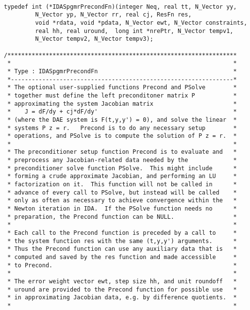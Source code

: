 \documentclass[11pt]{article}
\begin{document}
\small
\begin{verbatim}
                        
typedef int (*IDASpgmrPrecondFn)(integer Neq, real tt, N_Vector yy,
         N_Vector yp, N_Vector rr, real cj, ResFn res, 
         void *rdata, void *pdata, N_Vector ewt, N_Vector constraints, 
         real hh, real uround,  long int *nrePtr, N_Vector tempv1, 
         N_Vector tempv2, N_Vector tempv3);
 
/******************************************************************
 *                                                                *           
 * Type : IDASpgmrPrecondFn                                       *
 *----------------------------------------------------------------*
 * The optional user-supplied functions Precond and PSolve        *
 * together must define the left preconditoner matrix P           *
 * approximating the system Jacobian matrix                       *
 *    J = dF/dy + cj*dF/dy'                                       *
 * (where the DAE system is F(t,y,y') = 0), and solve the linear  *
 * systems P z = r.   Precond is to do any necessary setup        *
 * operations, and PSolve is to compute the solution of P z = r.  *
 *                                                                *
 * The preconditioner setup function Precond is to evaluate and   *
 * preprocess any Jacobian-related data needed by the             *
 * preconditioner solve function PSolve.  This might include      *
 * forming a crude approximate Jacobian, and performing an LU     *
 * factorization on it.  This function will not be called in      *
 * advance of every call to PSolve, but instead will be called    *
 * only as often as necessary to achieve convergence within the   *
 * Newton iteration in IDA.  If the PSolve function needs no      *
 * preparation, the Precond function can be NULL.                 *
 *                                                                *
 * Each call to the Precond function is preceded by a call to     *
 * the system function res with the same (t,y,y') arguments.      *
 * Thus the Precond function can use any auxiliary data that is   *
 * computed and saved by the res function and made accessible     *
 * to Precond.                                                    *
 *                                                                *
 * The error weight vector ewt, step size hh, and unit roundoff   *
 * uround are provided to the Precond function for possible use   *
 * in approximating Jacobian data, e.g. by difference quotients.  *
 *                                                                *

\end{verbatim}
\end{document}
